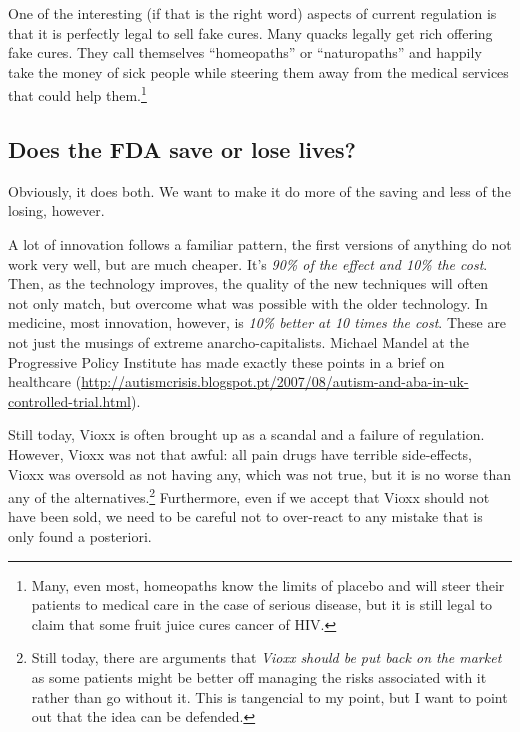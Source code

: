 One of the interesting (if that is the right word) aspects of current
regulation is that it is perfectly legal to sell fake cures. Many quacks
legally get rich offering fake cures. They call themselves ``homeopaths'' or
``naturopaths'' and happily take the money of sick people while steering them
away from the medical services that could help them.\footnote{Many, even most,
homeopaths know the limits of placebo and will steer their patients to medical
care in the case of serious disease, but it is still legal to claim that some
fruit juice cures cancer of HIV.}

\subsection{Does the FDA save or lose lives?}

Obviously, it does both. We want to make it do more of the saving and less of
the losing, however.

A lot of innovation follows a familiar pattern, the first versions of anything
do not work very well, but are much cheaper. It's \emph{90\% of the effect and
10\% the cost}. Then, as the technology improves, the quality of the new
techniques will often not only match, but overcome what was possible with the
older technology. In medicine, most innovation, however, is \emph{10\% better
at 10 times the cost}. These are not just the musings of extreme
anarcho-capitalists. Michael Mandel at the Progressive Policy Institute has
made exactly these points in a brief on healthcare
(\url{http://autismcrisis.blogspot.pt/2007/08/autism-and-aba-in-uk-controlled-trial.html}).

Still today, Vioxx is often brought up as a scandal and a failure of
regulation. However, Vioxx was not that awful: all pain drugs have terrible
side-effects, Vioxx was oversold as not having any, which was not true, but it
is no worse than any of the alternatives.\footnote{Still today, there are
arguments that \emph{Vioxx should be put back on the market} as some patients
might be better off managing the risks associated with it rather than go
without it. This is tangencial to my point, but I want to point out that the
idea can be defended.} Furthermore, even if we accept that Vioxx should not
have been sold, we need to be careful not to over-react to any mistake that is
only found a posteriori.

